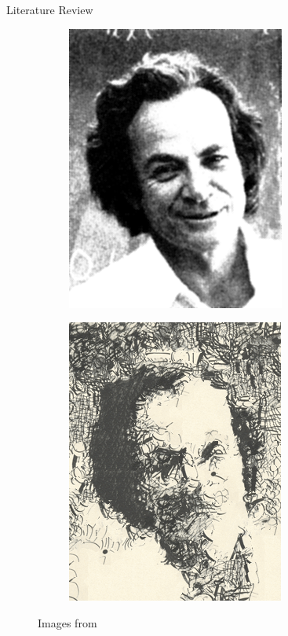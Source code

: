 \documentclass{beamer}
\begin{document}
\begin{frame}{Literature Review}
\begin{figure}[H]
\begin{subfigure}[b]{.3\textwidth}
        \end{subfigure}
        \begin{subfigure}[b]{.3\textwidth}
            \includegraphics[width=.8\textwidth]{img/previous_worksII_content.png}
        \end{subfigure}
        \begin{subfigure}[b]{.3\textwidth}
            \includegraphics[width=.8\textwidth]{img/previous_worksII_transfer.png}
        \end{subfigure}
        \caption*{Images from }
    \end{figure}
\end{frame}
\end{document}
